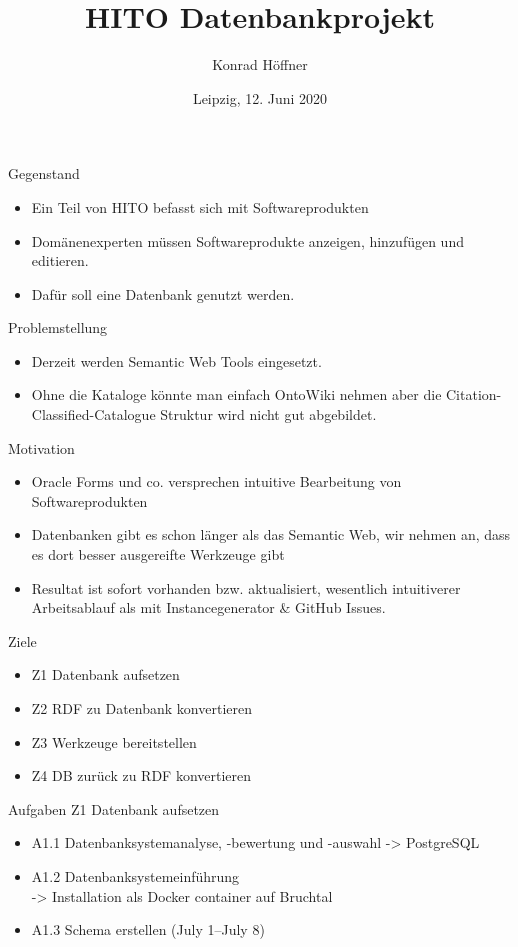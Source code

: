 \documentclass[aspectratio=169]{beamer}
\author{Konrad Höffner}
\date{Leipzig, 12. Juni 2020}
\title{HITO Datenbankprojekt}
\subtitle{}
\begin{document}
\begin{frame}
\titlepage
\end{frame}

\begin{frame}{Gegenstand}
\begin{itemize}
\item Ein Teil von HITO befasst sich mit Softwareprodukten
\item Domänenexperten müssen Softwareprodukte anzeigen, hinzufügen und editieren.
\item Dafür soll eine Datenbank genutzt werden.
\end{itemize}
\end{frame}

\begin{frame}{Problemstellung}
\begin{itemize}
\item Derzeit werden Semantic Web Tools eingesetzt.
\item Ohne die Kataloge könnte man einfach OntoWiki nehmen aber die Citation-Classified-Catalogue Struktur wird nicht gut abgebildet.
\end{itemize}
\end{frame}

\begin{frame}{Motivation}
\begin{itemize}
\item Oracle Forms und co. versprechen intuitive Bearbeitung von Softwareprodukten 
\item Datenbanken gibt es schon länger als das Semantic Web, wir nehmen an, dass es dort besser ausgereifte Werkzeuge gibt
\item Resultat ist sofort vorhanden bzw. aktualisiert, wesentlich intuitiverer Arbeitsablauf als mit Instancegenerator \& GitHub Issues.
\end{itemize}
\end{frame}
\begin{frame}{Ziele}
\begin{itemize}
\item Z1 Datenbank aufsetzen \checkmark
\item Z2 RDF zu Datenbank konvertieren
\item Z3 Werkzeuge bereitstellen
\item Z4 DB zurück zu RDF konvertieren
\end{itemize}
\end{frame}

\begin{frame}{Aufgaben Z1 Datenbank aufsetzen}
\begin{itemize}
\item A1.1 Datenbanksystemanalyse, -bewertung und -auswahl -> PostgreSQL \checkmark 
\item A1.2 Datenbanksystemeinführung\\-> Installation als Docker container auf Bruchtal \checkmark  
\item A1.3 Schema erstellen (July 1--July 8) \checkmark
\end{itemize}
\end{frame}
\end{document}
